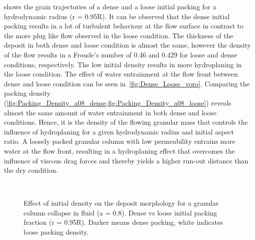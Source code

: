  shows the grain trajectories of a dense and a loose 
initial packing for a hydrodynamic radius (r = 0.95R). It can be observed that 
the dense initial packing results in a lot of turbulent behaviour at the flow 
surface in contrast to the more plug like flow observed in the loose condition. 
The thickness of the deposit in both dense and loose condition is almost the 
same, however the density of the flow results in a Froude's number of 0.46 and
0.429 for loose and dense conditions, respectively. The low initial density 
results in more hydroplaning in the loose condition. The effect of water 
entrainment at the flow front between dense and loose condition can be seen 
in~\cref{fig:Dense_Loose_voro}. Comparing the packing density 
(\cref{fig:Packing_Density_a08_dense,fig:Packing_Density_a08_loose}) 
reveals almost the same amount of water entrainment in both dense and loose 
conditions. Hence, it is the density of the flowing granular mass that controls 
the influence of hydroplaning for a given hydrodynamic radius and initial 
aspect ratio. A loosely packed granular column with low permeability entrains 
more water at the flow front, resulting in a hydroplaning effect that overcomes 
the influence of viscous drag forces and thereby yields a higher run-out 
distance than the dry condition.

\begin{figure}
\centering
{}\\
\caption{Effect of initial density on the deposit morphology
for a granular column collapse in fluid (a = 0.8). Dense vs loose initial 
packing fraction (r = 0.95R). Darker means dense packing, white indicates loose 
packing density.}
\label{fig:Dense_Loose_PT}
\end{figure}



